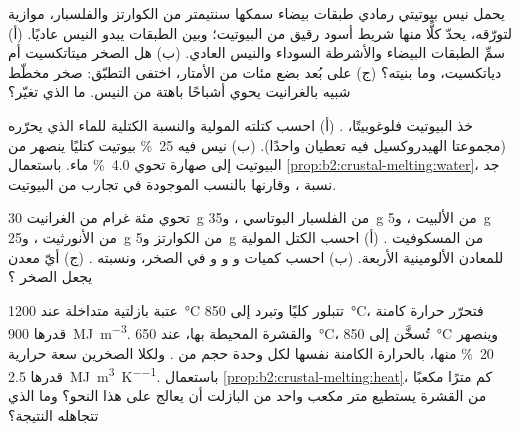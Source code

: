 \begin{exercise}[$\star$]\label{exo:b2:crustal-melting:4}
يحمل نيس بيوتيتي رمادي طبقات بيضاء سمكها سنتيمتر من الكوارتز والفلسبار، موازية
لتورّقه، يحدّ كلًّا منها شريط أسود رقيق من البيوتيت؛ وبين الطبقات يبدو
النيس عاديًا. (أ) سمِّ الطبقات البيضاء والأشرطة السوداء والنيس العادي.
(ب) هل الصخر ميتاتكسيت أم دياتكسيت، وما بنيته؟ (ج) على بُعد بضع مئات
من الأمتار، اختفى التطبّق: صخر مخطّط شبيه بالغرانيت يحوي أشباحًا باهتة من
النيس. ما الذي تغيّر؟
\end{exercise}

\begin{exercise}[$\star\star$]\label{exo:b2:crustal-melting:5}
خذ البيوتيت فلوغوبيتًا، . (أ) احسب كتلته المولية
والنسبة الكتلية للماء الذي يحرّره (مجموعتا الهيدروكسيل فيه تعطيان  واحدًا).
(ب) نيس فيه \qty{25}{\percent} بيوتيت كتليًا ينصهر  من البيوتيت
إلى صهارة تحوي \qty{4.0}{\percent} ماء. باستعمال
\cref{prop:b2:crustal-melting:water}، جد نسبة ، وقارنها
بالنسب الموجودة في تجارب  من البيوتيت.
\end{exercise}

\begin{exercise}[$\star\star$]\label{exo:b2:crustal-melting:6}
تحوي مئة غرام من الغرانيت \qty{30}{\gram} من الفلسبار البوتاسي ،
و\qty{35}{\gram} من الألبيت ، و\qty{5}{\gram} من الأنورثيت ،
و\qty{25}{\gram} من الكوارتز و\qty{5}{\gram} من المسكوفيت .
(أ) احسب الكتل المولية للمعادن الألومينية الأربعة. (ب) احسب كميات
 و و و في الصخر، ونسبته . (ج) أيّ
معدن يجعل الصخر ؟
\end{exercise}

\begin{exercise}[$\star\star$]\label{exo:b2:crustal-melting:7}
عتبة بازلتية متداخلة عند \qty{1200}{\celsius} تتبلور كليًا وتبرد إلى
\qty{850}{\celsius}، فتحرّر حرارة كامنة قدرها \qty{900}{\mega\joule\per\cubic\metre}.
والقشرة المحيطة بها، عند \qty{650}{\celsius}، تُسخَّن إلى \qty{850}{\celsius}
وينصهر \qty{20}{\percent} منها، بالحرارة الكامنة نفسها لكل وحدة حجم من . ولكلا
الصخرين سعة حرارية قدرها \qty{2.5}{\mega\joule\per\cubic\metre\per\kelvin}. باستعمال
\cref{prop:b2:crustal-melting:heat}، كم مترًا مكعبًا من القشرة يستطيع متر مكعب واحد
من البازلت أن يعالج على هذا النحو؟ وما الذي تتجاهله النتيجة؟
\end{exercise}

